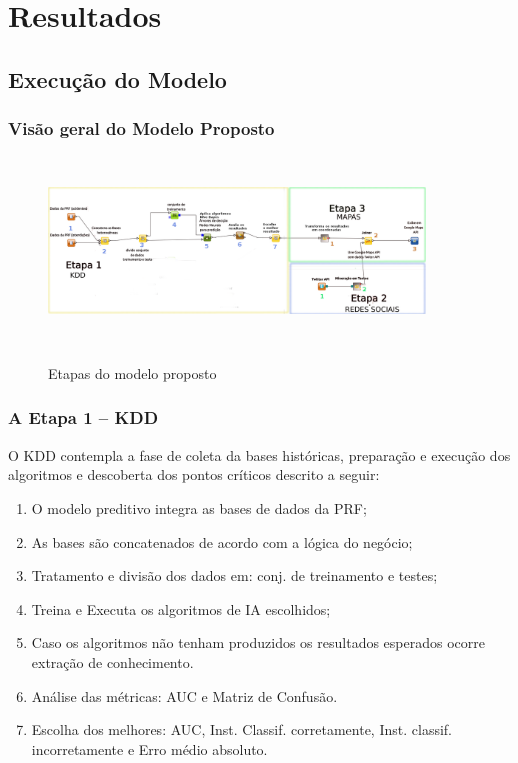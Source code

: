 \documentclass[11pt]{beamer}
\begin{document}
\section{Resultados}
\subsection{Execução do Modelo}

\begin{frame}
	\frametitle{ Visão geral do Modelo Proposto}
	\begin{figure}[ht]
		\centering
		\includegraphics[width=100mm, height=50mm]{Figuras/Resultados/metodologia.png}\\
		\caption{Etapas do modelo proposto}
	\end{figure}
\end{frame}

\begin{frame}
	\frametitle{A Etapa 1 -- KDD}
	O KDD contempla a fase de coleta da bases históricas, preparação e execução dos algoritmos e descoberta dos pontos críticos descrito a seguir:
	\pause
	\begin{enumerate}
		\item O modelo preditivo integra as bases de dados da PRF;
		\pause
		\item As bases são concatenados de acordo com a lógica do negócio;
		\pause
		\item Tratamento e divisão dos dados em: conj. de treinamento e testes;
		\pause
		\item Treina e Executa os algoritmos de IA escolhidos;
		\pause
		\item Caso os algoritmos não tenham produzidos os resultados esperados ocorre extração de conhecimento.
		\pause
		\item Análise das métricas: AUC e Matriz de Confusão.
		\pause
		\item Escolha dos melhores: AUC, Inst. Classif. corretamente, Inst. classif. incorretamente e Erro médio absoluto.
	\end{enumerate}
\end{frame}
\end{document}
